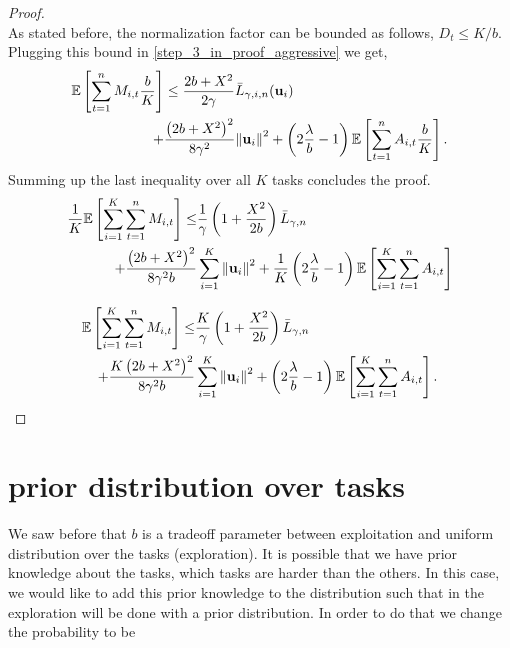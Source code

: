 {\begin{proof}
\begin{equation}
\end{equation}
As stated before, the normalization factor can be bounded as
follows,
$D_{t}\le K/b$.
Plugging this bound in \eqref{step_3_in_proof_aggressive} we get,
\begin{equation}\label{eq:bound_for_i_aggressive}
\begin{split}
\mathbb{E}\left[{\sum_{t=1}^{n}{M_{i,t}\frac{b}{K}}}\right]
&\le \frac{2b+X^2}{2\gamma}{\bar L}_{\gamma,i,n}(\mathbf{u}_{i})\\
+&\frac{\left({2b+X^2}\right)^2}{8{\gamma}^2}{\left\Vert \mathbf{u}_{i} \right\Vert}^2+ \left({2\frac{\lambda}{b}-1}\right)\mathbb{E}\left[{\sum_{t=1}^{n}{A_{i,t}\frac{b}{K}}}\right].
\end{split}
\end{equation}
Summing up the last inequality over all $K$ tasks concludes the proof.
\begin{equation*}
\begin{split}
\frac{1}{K}\mathbb{E}\left[ \sum_{i=1}^{K}\sum_{t=1}^{n}{M_{i,t}} \right]
\le&\frac{1}{\gamma}\left(1+\frac{X^2}{2b} \right){\bar L}_{\gamma,n}\\
+\frac{\left({2b+X^2}\right)^2}{8{\gamma}^2b}&\sum_{i=1}^{K}{{\left\Vert \mathbf{u}_{i} \right\Vert}^2}+ \frac{1}{K}\left({2\frac{\lambda}{b}-1}\right)\mathbb{E}\left[{\sum_{i=1}^{K}\sum_{t=1}^{n}{A_{i,t}}}\right]
\end{split}
\end{equation*}

\begin{equation}
\begin{split}
\mathbb{E}\left[ \sum_{i=1}^{K}\sum_{t=1}^{n}{M_{i,t}} \right]
\le&\frac{K}{\gamma}\left(1+\frac{X^2}{2b} \right){\bar L}_{\gamma,n}\\
+\frac{K\left({2b+X^2}\right)^2}{8{\gamma}^2b}&\sum_{i=1}^{K}{{\left\Vert \mathbf{u}_{i} \right\Vert}^2}+\left({2\frac{\lambda}{b}-1}\right)\mathbb{E}\left[{\sum_{i=1}^{K}\sum_{t=1}^{n}{A_{i,t}}}\right].
\end{split}
\label{final_eq}
\end{equation}
\QED
\end{proof}

\section{prior distribution over tasks}

We saw before that $b$ is a tradeoff parameter between  exploitation and uniform  distribution over the tasks (exploration). It is possible that we have prior knowledge about the tasks, which tasks are harder than the others. In this case, we would like to add this prior knowledge to the distribution such that in the exploration will be done with  a prior distribution.       
In order to do that we change the probability to be 

}

